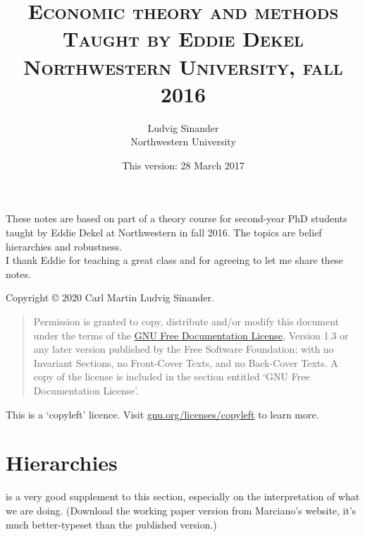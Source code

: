\documentclass[11pt,letterpaper,reqno,oneside]{article}
\title{\scshape Economic theory and methods \\
	\vspace{0.5em}
	\large \scshape Taught by Eddie Dekel \\
	\large \scshape Northwestern University, fall 2016
	}
\author{Ludvig Sinander \\ Northwestern University}
\date{\small This version: 28 March 2017}
\begin{document}
\maketitle


\noindent
These notes are based on part of a theory course for second-year PhD students taught by Eddie Dekel at Northwestern in fall 2016. The topics are belief hierarchies and robustness.\\

\noindent
I thank Eddie for teaching a great class and for agreeing to let me share these notes.



\pagebreak
\hspace{1pt}\vfill
\noindent
Copyright \copyright{} 2020 Carl Martin Ludvig Sinander.

\begin{quotation}
\noindent
Permission is granted to copy, distribute and/or modify this document under the terms of the \href{https://www.gnu.org/licenses/fdl}{GNU Free Documentation License}, Version 1.3 or any later version published by the Free Software Foundation; with no Invariant Sections, no Front-Cover Texts, and no Back-Cover Texts. A copy of the license is included in the section entitled `GNU
Free Documentation License'.
\end{quotation}

\noindent
This is a `copyleft' licence.
Visit \href{https://www.gnu.org/licenses/copyleft}{gnu.org/licenses/copyleft} to learn more.



\pagebreak
{}
\tableofcontents
{}



\pagebreak
\section{Hierarchies}
\label{sec:hierarchies}

\textcite{Siniscalchi2008} is a very good supplement to this section, especially on the interpretation of what we are doing. (Download the working paper version from Marciano's website, it's much better-typeset than the published version.)



\end{document}
